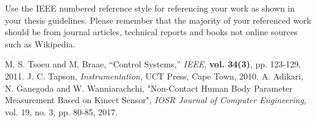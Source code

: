 Use the IEEE numbered reference style for referencing your work as shown in your thesis guidelines.
Please remember that the majority of your referenced work should be from journal articles, technical
reports and books not online sources such as Wikipedia.

\begin{thebibliography}{5}
 M. S. Tsoeu and M. Braae, ``Control Systems,'' \emph{IEEE}, {\bf vol. 34(3)}, pp. 123-129, 2011.
 J. C. Tapson, \emph{Instrumentation}, UCT Press, Cape Town, 2010.
 A. Adikari, N. Ganegoda and W. Wanniarachchi, "Non-Contact Human Body Parameter Measurement Based on Kinect Sensor", \emph{IOSR Journal of Computer Engineering}, vol. 19, no. 3, pp. 80-85, 2017.  
\end{thebibliography}
